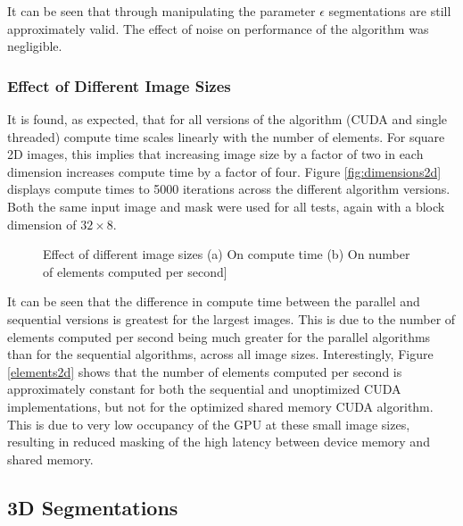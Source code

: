 It can be seen that through manipulating the parameter $\epsilon$ segmentations are still approximately valid. The effect of noise on performance of the algorithm was negligible.

\subsubsection{Effect of Different Image Sizes}\label{dimensions2d}

It is found, as expected, that for all versions of the algorithm (CUDA and single threaded) compute time scales linearly with the number of elements. For square 2D images, this implies that increasing image size by a factor of two in each dimension increases compute time by a factor of four. Figure \ref{fig:dimensions2d} displays compute times to 5000 iterations across the different algorithm versions. Both the same input image and mask were used for all tests, again with a block dimension of $32 \times 8$.

\begin{figure}[p]
	\begin{flushleft}
	\end{flushleft}
	\label{fig:speed}\caption{Effect of different image sizes (a) On compute time (b) On number of elements computed per second]}
\end{figure}

It can be seen that the difference in compute time between the parallel and sequential versions is greatest for the largest images. This is due to the number of elements computed per second being much greater for the parallel algorithms than for the sequential algorithms, across all image sizes. Interestingly, Figure \ref{elements2d} shows that the number of elements computed per second is approximately constant for both the sequential and unoptimized CUDA implementations, but not for the optimized shared memory CUDA algorithm. This is due to very low occupancy of the GPU at these small image sizes, resulting in reduced masking of the high latency between device memory and shared memory.




\subsection{3D Segmentations}

